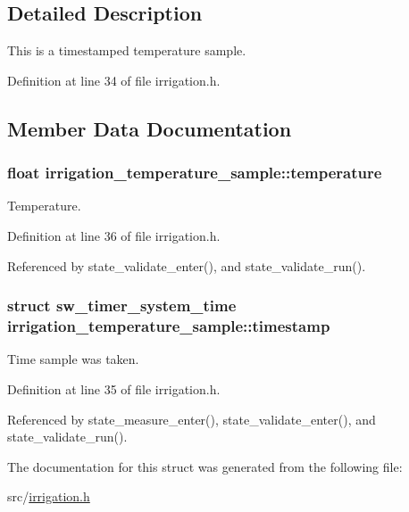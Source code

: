 \subsection{Detailed Description}
This is a timestamped temperature sample. 

Definition at line 34 of file irrigation.\+h.



\subsection{Member Data Documentation}
\hypertarget{structirrigation__temperature__sample_ae72c8bc3c16a24366685eecbf9493a2e}{}
\subsubsection[{temperature}]{\setlength{\rightskip}{0pt plus 5cm}float irrigation\+\_\+temperature\+\_\+sample\+::temperature}\label{structirrigation__temperature__sample_ae72c8bc3c16a24366685eecbf9493a2e}


Temperature. 



Definition at line 36 of file irrigation.\+h.



Referenced by state\+\_\+validate\+\_\+enter(), and state\+\_\+validate\+\_\+run().

\hypertarget{structirrigation__temperature__sample_aa10fbbf9f10f89fc9f246f42c26b0ad2}{}
\subsubsection[{timestamp}]{\setlength{\rightskip}{0pt plus 5cm}struct {\bf sw\+\_\+timer\+\_\+system\+\_\+time} irrigation\+\_\+temperature\+\_\+sample\+::timestamp}\label{structirrigation__temperature__sample_aa10fbbf9f10f89fc9f246f42c26b0ad2}


Time sample was taken. 



Definition at line 35 of file irrigation.\+h.



Referenced by state\+\_\+measure\+\_\+enter(), state\+\_\+validate\+\_\+enter(), and state\+\_\+validate\+\_\+run().



The documentation for this struct was generated from the following file\+:\begin{DoxyCompactItemize}
\item 
src/\hyperlink{irrigation_8h}{irrigation.\+h}\end{DoxyCompactItemize}

